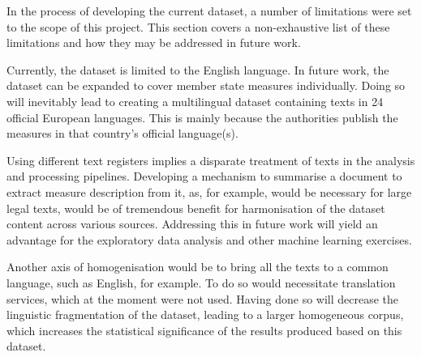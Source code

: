 In the process of developing the current dataset, a number of limitations were set to the scope of this project. This section covers a non-exhaustive list of these limitations and how they may be addressed in future work.

Currently, the dataset is limited to the English language. In future work, the dataset can be expanded to cover member state measures individually. Doing so will inevitably lead to creating a multilingual dataset containing texts in 24 official European languages. This is mainly because the authorities publish the measures in that country’s official language(s).

Using different text registers implies a disparate treatment of texts in the analysis and processing pipelines. Developing a mechanism to summarise a document to extract measure description from it, as, for example, would be necessary for large legal texts, would be of tremendous benefit for harmonisation of the dataset content across various sources. Addressing this in future work will yield an advantage for the exploratory data analysis and other machine learning exercises.

Another axis of homogenisation would be to bring all the texts to a common language, such as English, for example. To do so would necessitate translation services, which at the moment were not used. Having done so will decrease the linguistic fragmentation of the dataset, leading to a larger homogeneous corpus, which increases the statistical significance of the results produced based on this dataset.

\enlargethispage{2em}
